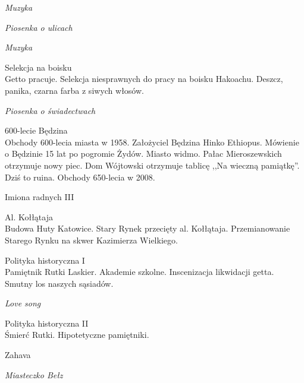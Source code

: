 \documentclass[10pt,a4paper,oneside]{article}
\begin{document}
{\color{sound}
{\large \emph{Muzyka}}
}

{\color{sound}
{\large \emph{Piosenka o ulicach}}
}

{\color{sound}
{\large \emph{Muzyka}}
}

{\color{extras}
{\large Selekcja na boisku}\\
Getto pracuje. Selekcja niesprawnych do pracy na boisku
Hakoachu. Deszcz, panika, czarna farba z siwych włosów.
}

{\color{sound}
{\large \emph{Piosenka o świadectwach}}
}

{\large 600-lecie Będzina}\\
Obchody 600-lecia miasta w 1958. Założyciel Będzina Hinko
Ethiopus. Mówienie o Będzinie 15 lat po pogromie Żydów.
Miasto widmo. Pałac Mieroszewskich otrzymuje nowy piec.
Dom Wójtowski otrzymuje tablicę ,,Na wieczną pamiątkę''. 
Dziś to ruina. Obchody 650-lecia w 2008.

{\large\color{loss} Imiona radnych III}

{\color{extras}
{\large Al. Kołłątaja}\\
Budowa Huty Katowice. Stary Rynek przecięty al. Kołłątaja.
Przemianowanie Starego Rynku na skwer Kazimierza Wielkiego.
}

{\large Polityka historyczna I}\\
Pamiętnik Rutki Laskier. Akademie szkolne. Inscenizacja
likwidacji getta. Smutny los naszych sąsiadów.


{\color{sound}
{\large \emph{Love song}}
}


{\large Polityka historyczna II}\\
Śmierć Rutki. Hipotetyczne pamiętniki. 


{\large\color{loss} Zahava}


{\color{sound}
{\large \emph{Miasteczko Bełz}}
}
\end{document}

